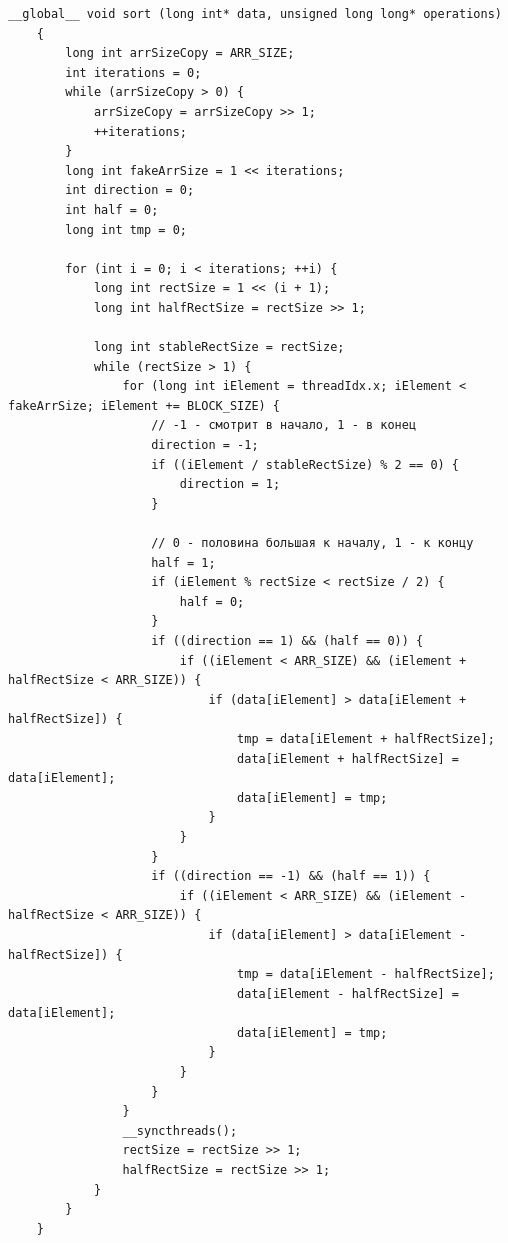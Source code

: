 \documentclass[a4paper,article]{article}
\begin{document}
    \begin{lstlisting}[label=gpu-bitonic-sort,caption=Битонная сортировка на GPU]
    __global__ void sort (long int* data, unsigned long long* operations)
    {
        long int arrSizeCopy = ARR_SIZE;
        int iterations = 0;
        while (arrSizeCopy > 0) {
            arrSizeCopy = arrSizeCopy >> 1;
            ++iterations;
        }
        long int fakeArrSize = 1 << iterations;
        int direction = 0;
        int half = 0;
        long int tmp = 0;

        for (int i = 0; i < iterations; ++i) {
            long int rectSize = 1 << (i + 1);
            long int halfRectSize = rectSize >> 1;

            long int stableRectSize = rectSize;
            while (rectSize > 1) {
                for (long int iElement = threadIdx.x; iElement < fakeArrSize; iElement += BLOCK_SIZE) {
                    // -1 - смотрит в начало, 1 - в конец
                    direction = -1;
                    if ((iElement / stableRectSize) % 2 == 0) {
                        direction = 1;
                    }

                    // 0 - половина большая к началу, 1 - к концу
                    half = 1;
                    if (iElement % rectSize < rectSize / 2) {
                        half = 0;
                    }
                    if ((direction == 1) && (half == 0)) {
                        if ((iElement < ARR_SIZE) && (iElement + halfRectSize < ARR_SIZE)) {
                            if (data[iElement] > data[iElement + halfRectSize]) {
                                tmp = data[iElement + halfRectSize];
                                data[iElement + halfRectSize] = data[iElement];
                                data[iElement] = tmp;
                            }
                        }
                    }
                    if ((direction == -1) && (half == 1)) {
                        if ((iElement < ARR_SIZE) && (iElement - halfRectSize < ARR_SIZE)) {
                            if (data[iElement] > data[iElement - halfRectSize]) {
                                tmp = data[iElement - halfRectSize];
                                data[iElement - halfRectSize] = data[iElement];
                                data[iElement] = tmp;
                            }
                        }
                    }
                }
                __syncthreads();
                rectSize = rectSize >> 1;
                halfRectSize = rectSize >> 1;
            }
        }
    }
    \end{lstlisting}
\end{document}

